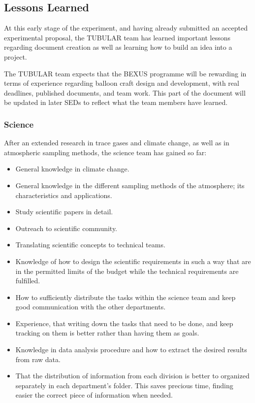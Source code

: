 \pagebreak
\subsection{Lessons Learned}
At this early stage of the experiment, and having already submitted an accepted experimental proposal, the TUBULAR team has learned important lessons regarding document creation as well as learning how to build an idea into a project. \par
The TUBULAR team expects that the BEXUS programme will be rewarding in terms of experience regarding balloon craft design and development, with real deadlines, published documents, and team work. This part of the document will be updated in later SEDs to reflect what the team members have learned.

\subsubsection{Science}
After an extended research in trace gases and climate change, as well as in atmospheric sampling methods, the science team has gained so far: 
\begin{itemize}
    \item General knowledge in climate change.
    \item General knowledge in the different sampling methods of the atmosphere; its characteristics and applications.
    \item Study scientific papers in detail.
    \item Outreach to scientific community.
    \item Translating scientific concepts to technical teams.
    \item Knowledge of how to design the scientific requirements in such a way that are in the permitted limits of the budget while the technical requirements are fulfilled.   
    \item How to sufficiently distribute the tasks within the science team and keep good communication with the other departments. 
    \item Experience, that writing down the tasks that need to be done, and keep tracking on them is better rather than having them as goals.   
    \item Knowledge in data analysis procedure and how to extract the desired results from raw data.
    \item That the distribution of information from each division is better to organized separately in each department's folder. This saves precious time, finding easier the correct piece of information when needed. 
\end{itemize}


